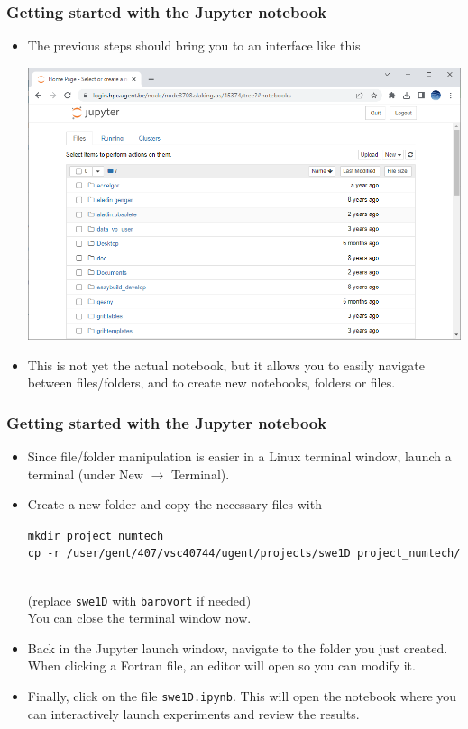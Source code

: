 \documentclass[aspectratio=43,9pt]{beamer}
\begin{document}
\begin{frame}
	\frametitle{Getting started with the Jupyter notebook}
	\begin{itemize}
		\item The previous steps should bring you to an interface like this\vspace*{2ex}
			\begin{center}
				\includegraphics[width=.6\textwidth]{jupyter_home}
			\end{center}\vspace*{3ex}
		\item This is not yet the actual notebook, but it allows you to easily navigate between files/folders, and to create new notebooks, folders or files.
	\end{itemize}
\end{frame}
%
%
\begin{frame}
	\frametitle{Getting started with the Jupyter notebook}
	\begin{itemize}
		\item Since file/folder manipulation is easier in a Linux terminal window, launch a terminal (under New $\rightarrow$ Terminal).\vspace*{3ex}
		\item Create a new folder and copy the necessary files with\\[2ex]
			\begin{minipage}{\textwidth}
				\texttt{mkdir project\_numtech}\\
				\texttt{cp -r /user/gent/407/vsc40744/ugent/projects/swe1D project\_numtech/}
			\end{minipage}\\[2ex]
			(replace \texttt{swe1D} with \texttt{barovort} if needed)\\
			You can close the terminal window now.\vspace*{3ex}
		\item Back in the Jupyter launch window, navigate to the folder you just created. When clicking a Fortran file, an editor will open so you can modify it.\vspace*{3ex}
		\item Finally, click on the file \texttt{swe1D.ipynb}. This will open the notebook where you can interactively launch experiments and review the results.
	\end{itemize}
\end{frame}
\end{document}
